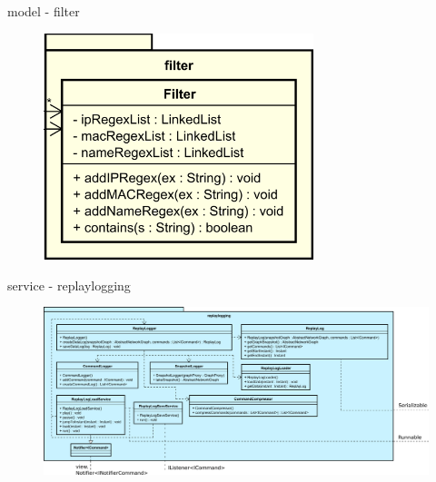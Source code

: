 \begin{frame}{model - filter}
  \begin{figure}
    \centering
    \includegraphics[width=0.7\textwidth]{./images/filter.png}
  \end{figure}
\end{frame}

\begin{frame}{service - replaylogging}
  \begin{figure}
    \centering
    \includegraphics[width=\textwidth]{./images/replaylogging.png}
  \end{figure}
\end{frame}
